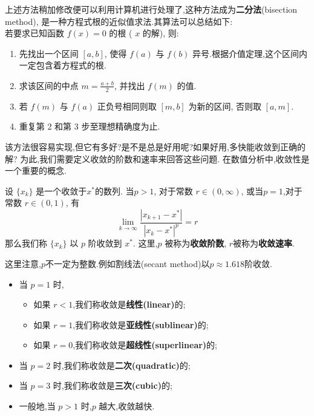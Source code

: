 上述方法稍加修改便可以利用计算机进行处理了,这种方法成为\textbf{二分法}(bisection method),
是一种方程式根的近似值求法.其算法可以总结如下:
\\
若要求已知函数 $f(x)=0$ 的根 ( $x$ 的解), 则:
\begin{enumerate}
    \item  先找出一个区间 $[a, b]$, 使得 $f(a)$ 与 $f(b)$ 异号.根据介值定理,这个区间内一定包含着方程式的根.
    \item  求该区间的中点 $m=\frac{a+b}{2}$, 并找出 $f(m)$ 的值.
    \item  若 $f(m)$ 与 $f(a)$ 正负号相同则取 $[m, b]$ 为新的区间, 否则取 $[a, m]$.
    \item  重复第 2 和第 3 步至理想精确度为止.
\end{enumerate}
该方法很容易实现,但它有多好?是不是总是好用呢?如果好用,多快能收敛到正确的解?
为此,我们需要定义收敛的阶数和速率来回答这些问题.
在数值分析中,收敛性是一个重要的概念.

\begin{definition}
    设 $\{x_k\}$ 是一个收敛于$x^*$的数列.
    当$p>1$, 对于常数 $r\in (0, \infty)$, 
    或当$p=1$,对于常数 $r\in (0, 1)$, 
    有
\begin{equation}
    \lim_{k\to \infty} \frac{|x_{k+1} - x^*| } {|x_k - x^*|^p} = r
\end{equation}
那么我们称 $\{x_k\}$ 以 $p$ 阶收敛到 $x^*$.
这里,$p$ 被称为\textbf{收敛阶数}, $r$被称为\textbf{收敛速率}.
\end{definition}
这里注意,$p$不一定为整数.例如割线法(secant method)以$p\approx 1.618$阶收敛.
\begin{itemize}
    \item 当 $p = 1$ 时,
        \begin{itemize}
            \item 如果 $r < 1$,我们称收敛是\textbf{线性(linear)}的;
            \item 如果 $r = 1$,我们称收敛是\textbf{亚线性(sublinear)}的;
            \item 如果 $r = 0$,我们称收敛是\textbf{超线性(superlinear)}的;
        \end{itemize}
    \item 当 $p = 2$ 时,我们称收敛是\textbf{二次(quadratic)}的;
    \item 当 $p = 3$ 时,我们称收敛是\textbf{三次(cubic)}的;
    \item 一般地,当 $p > 1$ 时,$p$ 越大,收敛越快.
\end{itemize}

